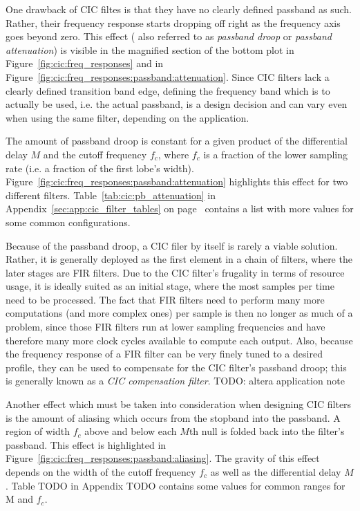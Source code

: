 One  drawback of  CIC filtes  is that  they have  no clearly  defined passband
as  such. Rather,  their  frequency  response starts  dropping  off  right  as
the  frequency axis  goes  beyond  zero. This effect  (  also  referred to  as
\emph{passband  droop}  or  \emph{passband  attenuation}) is  visible  in  the
magnified section  of the  bottom plot  in Figure~\ref{fig:cic:freq_responses}
and  in   Figure~\ref{fig:cic:freq_responses:passband:attenuation}. Since  CIC
filters lack  a clearly defined  transition band edge, defining  the frequency
band which  is to  actually be  used, i.e.  the actual  passband, is  a design
decision  and can  vary even  when  using the  same filter,  depending on  the
application.

The  amount  of  passband  droop  is  constant for  a  given  product  of  the
differential  delay $M$  and  the cutoff  frequency $f_c$,  where  $f_c$ is  a
fraction  of the  lower sampling  rate (i.e.  a fraction  of the  first lobe's
width). Figure~\ref{fig:cic:freq_responses:passband:attenuation}    highlights
this  effect  for  two  different  filters. Table~\ref{tab:cic:pb_attenuation}
in                 Appendix~\ref{sec:app:cic_filter_tables}                 on
page~\pageref{tab:cic:pb_attenuation}  contains a  list with  more values  for
some common configurations.

Because  of the  passband droop,  a CIC  filer by  itself is  rarely a  viable
solution. Rather, it is generally deployed as  the first element in a chain of
filters,  where the  later stages  are FIR  filters. Due to  the CIC  filter's
frugality  in terms  of resource  usage, it  is ideally  suited as  an initial
stage, where the most samples per time need to be processed. The fact that FIR
filters need  to perform many  more computations  (and more complex  ones) per
sample is then no longer as much of  a problem, since those FIR filters run at
lower sampling frequencies and have therefore many more clock cycles available
to compute each  output. Also, because the frequency response of  a FIR filter
can be very finely tuned to a  desired profile, they can be used to compensate
for the  CIC filter's passband droop;  this is generally known  as a \emph{CIC
compensation filter}.
TODO: altera application note

Another  effect which  must be  taken  into consideration  when designing  CIC
filters is  the amount  of aliasing  which occurs from  the stopband  into the
passband. A  region  of  width  $f_c$  above and  below  each  $M$th  null  is
folded  back  into  the  filter's  passband. This  effect  is  highlighted  in
Figure~\ref{fig:cic:freq_responses:passband:aliasing}.   The  gravity of  this
effect depends  on the  width of  the cutoff  frequency $f_c$  as well  as the
differential delay $M$. Table  TODO in Appendix TODO contains  some values for
common ranges for M and $f_c$.

